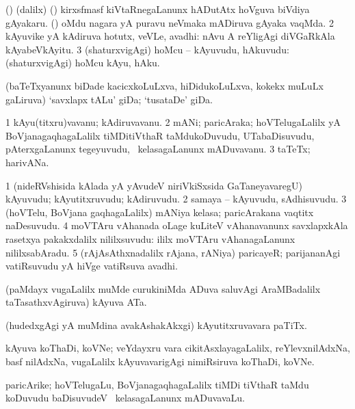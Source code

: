 \bentry
{} 
\gl{\nA}
\expl{}
\bmng
\bnum
{} (\birx) (\bava dalilx) 
\banum
{} (\pArxparx) kirxsfmasf kiVtaRnegaLanunx hADutAtx hoVguva biVdiya gAyakaru. 
 (\ca) oMdu nagara yA puravu neVmaka mADiruva gAyaka vaqMda. 
\eanum
\numie
\num{2} kAyuvike yA kAdiruva hotutx, veVLe, avadhi:  nAvu A reYligAgi diVGaRkAla kAyabeVkAyitu. 
\num{3} (shaturxvigAgi) hoMcu -- kAyuvudu, hAkuvudu:  (shaturxvigAgi) hoMcu kAyu, hAku. 
\enum
\emng
\eentry

\bentry
{} 
\gl{\nA}
\expl{}
\bmng
(baTeTxyanunx biDade kacicxkoLuLxva, hiDidukoLuLxva, kokekx muLuLx gaLiruva) `savxlapx tALu' giDa; `tusataDe' giDa. 
\emng
\eentry

\bentry
{} 
\gl{\nA}
\bmng
\bnum
\num{1} kAyu(titxru)vavanu; kAdiruvavanu. 
\num{2} mANi; paricAraka; hoVTelugaLalilx yA BoVjanagaqhagaLalilx tiMDitiVthaR taMdukoDuvudu, UTabaDisuvudu, pAterxgaLanunx tegeyuvudu, \mo\ kelasagaLanunx mADuvavanu. 
\num{3} taTeTx; harivANa. 
\enum
\emng
\eentry

\bentry
{} 
\gl{\nA}
\bmng
\bnum
\num{1} (nideRVshisida kAlada yA yAvudeV niriVkiSxsida GaTaneyavaregU) kAyuvudu; kAyutitxruvudu; kAdiruvudu. 
\num{2} samaya -- kAyuvudu, sAdhisuvudu. 
\num{3} (hoVTelu, BoVjana gaqhagaLalilx) mANiya kelasa; paricArakana vaqtitx naDesuvudu. 
\num{4} moVTAru vAhanada oLage kuLiteV vAhanavanunx savxlapxkAla rasetxya pakakxdalilx nililxsuvudu:  ililx moVTAru vAhanagaLanunx nililxsabAradu. 
\num{5} (rAjAsAthxnadalilx rAjana, rANiya) paricayeR; parijananAgi vatiRsuvudu yA hiVge vatiRsuva avadhi. 
\enum
\emng
\eentry

\bentry
{}
\gl{\nA}
\expl{}
\bmng
(paMdayx \mo vugaLalilx muMde curukiniMda ADuva saluvAgi AraMBadalilx taTasathxvAgiruva) kAyuva ATa. 
\emng
\eentry

\bentry
{} 
\gl{\nA}
\expl{}
\bmng
(hudedxgAgi yA muMdina avakAshakAkxgi) kAyutitxruvavara paTiTx. 
\emng
\eentry

\bentry
{} 
\gl{\nA}
\expl{}
\bmng
kAyuva koThaDi, koVNe; veYdayxru \mo vara cikitAsxlayagaLalilx, reYlevxnilAdxNa, basf nilAdxNa, \mo vugaLalilx kAyuvavarigAgi nimiRsiruva koThaDi, koVNe. 
\emng
\eentry

\bentry
{} 
\gl{\nA}
\bmng
paricArike; hoVTelugaLu, BoVjanagaqhagaLalilx tiMDi tiVthaR taMdu koDuvudu baDisuvudeV \mo\ kelasagaLanunx mADuvavaLu. 
\emng
\eentry

